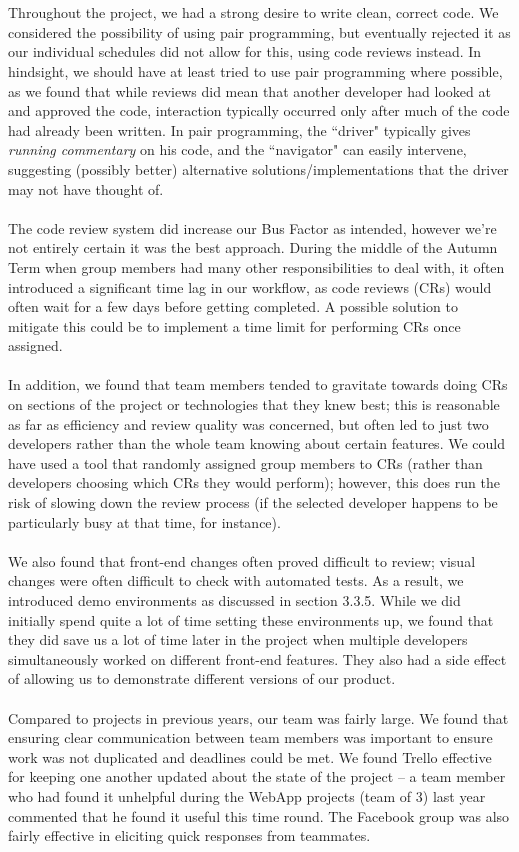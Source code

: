 \documentclass[a4paper, 10pt]{report}
\begin{document}
\\\\
Throughout the project, we had a strong desire to write clean, correct code. We considered the possibility of using pair programming, but eventually rejected it as our individual schedules did not allow for this, using code reviews instead. In hindsight, we should have at least tried to use pair programming where possible, as we found that while reviews did mean that another developer had looked at and approved the code, interaction typically occurred only after much of the code had already been written. In pair programming, the ``driver" typically gives \textit{running commentary} on his code, and the ``navigator" can easily intervene, suggesting (possibly better) alternative solutions/implementations that the driver may not have thought of. \cite{pair-prog}
\\\\
The code review system did increase our Bus Factor as intended, however we're not entirely certain it was the best approach. During the middle of the Autumn Term when group members had many other responsibilities to deal with, it often introduced a significant time lag in our workflow, as code reviews (CRs) would often wait for a few days before getting completed. A possible solution to mitigate this could be to implement a time limit for performing CRs once assigned. 
\\\\
In addition, we found that team members tended to gravitate towards doing CRs on sections of the project or technologies that they knew best; this is reasonable as far as efficiency and review quality was concerned, but often led to just two developers rather than the whole team knowing about certain features. We could have used a tool that randomly assigned group members to CRs (rather than developers choosing which CRs they would perform); however, this does run the risk of slowing down the review process (if the selected developer happens to be particularly busy at that time, for instance).
\\\\
We also found that front-end changes often proved difficult to review; visual changes were often difficult to check with automated tests. As a result, we introduced demo environments as discussed in section 3.3.5. While we did initially spend quite a lot of time setting these environments up, we found that they did save us a lot of time later in the project when multiple developers simultaneously worked on different front-end features. They also had a side effect of allowing us to demonstrate different versions of our product.
\\\\
Compared to projects in previous years, our team was fairly large. We found that ensuring clear communication between team members was important to ensure work was not duplicated and deadlines could be met. We found Trello effective for keeping one another updated about the state of the project -- a team member who had found it unhelpful during the WebApp projects (team of 3) last year commented that he found it useful this time round. The Facebook group was also fairly effective in eliciting quick responses from teammates.
\end{document}
